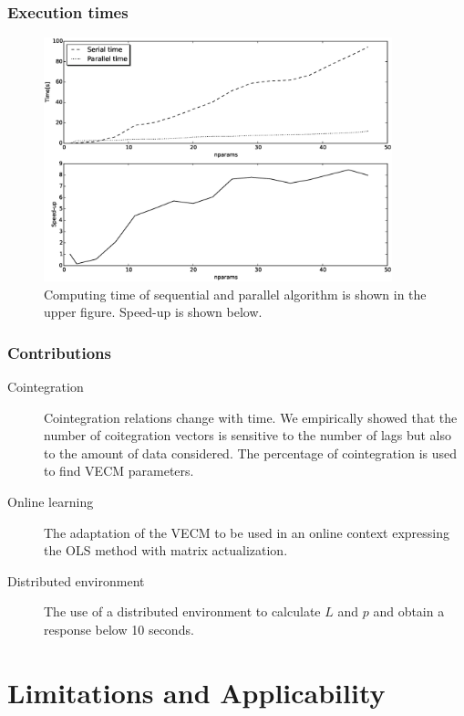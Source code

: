 \documentclass{beamer}
\begin{document}
%
\begin{frame}
\frametitle{Execution times}
\begin{figure}[ht]
  \centering
  \includegraphics[width=0.9\textwidth]{img/51_Fig3}
  \caption[Computing time and Speed-up]{Computing time of sequential and parallel algorithm is shown in the
  upper figure. Speed-up is shown below.}
  \label{fig:extimes}
\end{figure}
\end{frame}

\begin{frame}
\frametitle{Contributions}
\begin{description}
\item[Cointegration]Cointegration relations change with time. We empirically showed that the number of coitegration vectors is sensitive to the number of lags but also to the amount of data considered. The percentage of cointegration is used to find VECM parameters.
\item[Online learning] The adaptation of the VECM to be used in an online context expressing the OLS method with matrix actualization.
\item[Distributed environment] The use of a distributed environment to calculate $L$ and $p$ and obtain a response below 10 seconds.
\end{description}
\end{frame}

\section{Limitations and Applicability}
\end{document}
